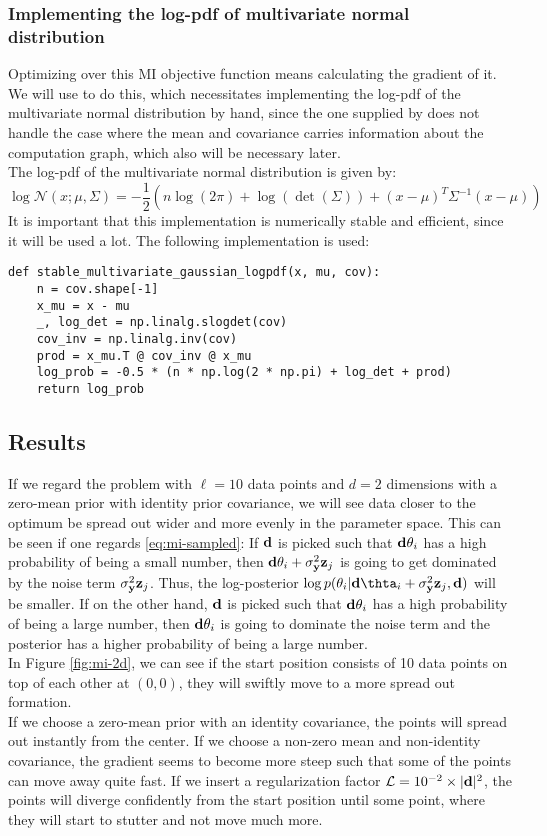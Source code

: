 \subsubsection{Implementing the log-pdf of multivariate normal distribution}
Optimizing over this MI objective function means calculating the gradient of it. 
We will use  to do this, which necessitates implementing the log-pdf of the multivariate normal distribution by hand, 
since the one supplied by  does not handle the case where the mean and covariance carries information about the computation graph, which also will be necessary later.\\
The log-pdf of the multivariate normal distribution is given by:
\begin{equation}
  \log \mathcal{N}(x; \mu, \Sigma) = -\frac{1}{2}(n\log(2\pi) + \log(\det(\Sigma)) + (x - \mu)^T\Sigma^{-1}(x - \mu))
\end{equation}
It is important that this implementation is numerically stable and efficient, since it will be used a lot.
The following implementation is used:
\begin{verbatim}
def stable_multivariate_gaussian_logpdf(x, mu, cov):
    n = cov.shape[-1]
    x_mu = x - mu
    _, log_det = np.linalg.slogdet(cov)
    cov_inv = np.linalg.inv(cov)
    prod = x_mu.T @ cov_inv @ x_mu
    log_prob = -0.5 * (n * np.log(2 * np.pi) + log_det + prod)
    return log_prob
\end{verbatim}
\subsection{Results}
If we regard the problem with $\ell = 10$ data points and $d=2$ dimensions with a zero-mean prior with identity prior covariance, 
we will see data closer to the optimum be spread out wider and more evenly in the parameter space.
This can be seen if one regards \eqref{eq:mi-sampled}:
If $\mathbf{d}$ is picked such that $\mathbf{d}\theta_i$ has a high probability of being a small number, then
$\mathbf{d}\theta_i + \sigma^2_{\mathbf{y}}\mathbf{z}_j$ is going to get dominated by the noise term $\sigma^2_{\mathbf{y}}\mathbf{z}_j$.
Thus, the log-posterior $\log p(\theta_i | \B{d}\thta_i + \sigma^2_\B{y}\B{z}_j, \B{d})$ will be smaller.
If on the other hand, $\mathbf{d}$ is picked such that $\mathbf{d}\theta_i$ has a high probability of being a large number, then $\mathbf{d}\theta_i$ is going to dominate the noise term
and the posterior has a higher probability of being a large number.\\
In Figure \ref{fig:mi-2d}, we can see if the start position consists of 10 data points on top of each other at $(0,0)$, they will swiftly move to a more spread out formation.\\
If we choose a zero-mean prior with an identity covariance, the points will spread out instantly from the center. If we choose a non-zero mean and non-identity covariance, 
the gradient seems to become more steep such that some of the points can move away quite fast.
If we insert a regularization factor $\mathcal{L} = 10^{-2}\times |\mathbf{d}|^2$, the points will diverge confidently from the start position until some point, where they will start to stutter and not move much more.

